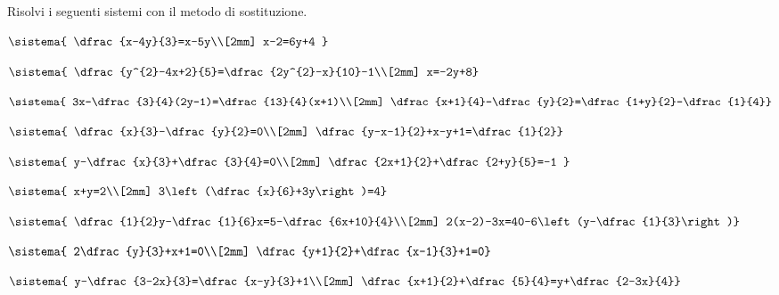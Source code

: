 \begin{esercizio}[*]
 \label{ese:22.8}
Risolvi i seguenti sistemi con il metodo di sostituzione.
 \begin{enumeratea}
 \item \(\sistema{
\dfrac{x-4y}{3}=x-5y\\[2mm]
x-2=6y+4 }\)
\item \(\sistema{
\dfrac{y^{2}-4x+2}{5}=\dfrac{2y^{2}-x}{10}-1\\[2mm]
x=-2y+8}\)
\item \(\sistema{
3x-\dfrac{3}{4}(2y-1)=\dfrac{13}{4}(x+1)\\[2mm]
\dfrac{x+1}{4}-\dfrac{y}{2}=\dfrac{1+y}{2}-\dfrac{1}{4}}\)
\item \(\sistema{
\dfrac{x}{3}-\dfrac{y}{2}=0\\[2mm]
\dfrac{y-x-1}{2}+x-y+1=\dfrac{1}{2}}\)
\item \(\sistema{
y-\dfrac{x}{3}+\dfrac{3}{4}=0\\[2mm]
\dfrac{2x+1}{2}+\dfrac{2+y}{5}=-1
}\)
\item \(\sistema{
x+y=2\\[2mm]
3\left(\dfrac{x}{6}+3y\right)=4}\)
\item \(\sistema{
\dfrac{1}{2}y-\dfrac{1}{6}x=5-\dfrac{6x+10}{4}\\[2mm]
2(x-2)-3x=40-6\left(y-\dfrac{1}{3}\right)}\)
\item \(\sistema{
2\dfrac{y}{3}+x+1=0\\[2mm]
\dfrac{y+1}{2}+\dfrac{x-1}{3}+1=0}\)
\item \(\sistema{
y-\dfrac{3-2x}{3}=\dfrac{x-y}{3}+1\\[2mm]
\dfrac{x+1}{2}+\dfrac{5}{4}=y+\dfrac{2-3x}{4}}\)
\end{enumeratea}
\end{esercizio}
 

